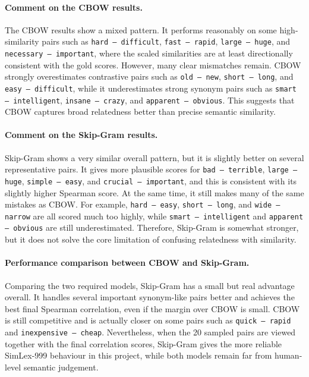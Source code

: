 \documentclass[11pt,a4paper]{article}
\begin{document}
\paragraph{Comment on the CBOW results.}
The CBOW results show a mixed pattern. It performs reasonably on some high-similarity pairs such as \texttt{hard -- difficult}, \texttt{fast -- rapid}, \texttt{large -- huge}, and \texttt{necessary -- important}, where the scaled similarities are at least directionally consistent with the gold scores. However, many clear mismatches remain. CBOW strongly overestimates contrastive pairs such as \texttt{old -- new}, \texttt{short -- long}, and \texttt{easy -- difficult}, while it underestimates strong synonym pairs such as \texttt{smart -- intelligent}, \texttt{insane -- crazy}, and \texttt{apparent -- obvious}. This suggests that CBOW captures broad relatedness better than precise semantic similarity.

\paragraph{Comment on the Skip-Gram results.}
Skip-Gram shows a very similar overall pattern, but it is slightly better on several representative pairs. It gives more plausible scores for \texttt{bad -- terrible}, \texttt{large -- huge}, \texttt{simple -- easy}, and \texttt{crucial -- important}, and this is consistent with its slightly higher Spearman score. At the same time, it still makes many of the same mistakes as CBOW. For example, \texttt{hard -- easy}, \texttt{short -- long}, and \texttt{wide -- narrow} are all scored much too highly, while \texttt{smart -- intelligent} and \texttt{apparent -- obvious} are still underestimated. Therefore, Skip-Gram is somewhat stronger, but it does not solve the core limitation of confusing relatedness with similarity.

\paragraph{Performance comparison between CBOW and Skip-Gram.}
Comparing the two required models, Skip-Gram has a small but real advantage overall. It handles several important synonym-like pairs better and achieves the best final Spearman correlation, even if the margin over CBOW is small. CBOW is still competitive and is actually closer on some pairs such as \texttt{quick -- rapid} and \texttt{inexpensive -- cheap}. Nevertheless, when the 20 sampled pairs are viewed together with the final correlation scores, Skip-Gram gives the more reliable SimLex-999 behaviour in this project, while both models remain far from human-level semantic judgement.
\end{document}

